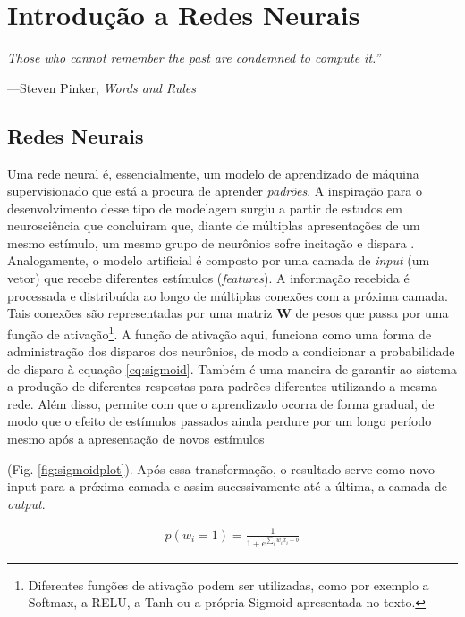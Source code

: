 \chapter{Introdução a Redes Neurais}
\label{ch:02-background}

\epigraph{\itshape Those who cannot remember the past are condemned to compute it.''}{---Steven Pinker, \textit{Words and Rules}}

\section{Redes Neurais}

Uma rede neural é, essencialmente, um modelo de aprendizado de máquina supervisionado %
que está a procura de aprender \textit{padrões}. A inspiração para o desenvolvimento desse tipo de modelagem surgiu a partir de estudos em neurosciência %
que concluiram que, diante de múltiplas apresentações de um mesmo estímulo, um mesmo grupo de neurônios sofre incitação e dispara%
.  Analogamente, o modelo artificial é composto por uma camada de \textit{input} (um vetor) que recebe diferentes estímulos (\textit{features}). A informação recebida é processada e distribuída ao longo de múltiplas conexões com a próxima camada. Tais conexões são representadas por uma matriz \textbf{W} de pesos que passa por uma função de ativação\footnote{Diferentes funções de ativação podem ser utilizadas, como por exemplo a Softmax, a RELU, a Tanh ou a própria Sigmoid apresentada no texto.}. A função de ativação aqui, funciona como uma forma de administração dos disparos dos neurônios, de modo a condicionar a probabilidade de disparo à equação \ref{eq:sigmoid}. Também é uma maneira de garantir ao sistema a produção de diferentes respostas para padrões diferentes utilizando a mesma rede. Além disso, permite com que o aprendizado ocorra de forma gradual, de modo que o efeito de estímulos passados ainda perdure por um longo período mesmo após a apresentação de novos estímulos 

(Fig. \ref{fig:sigmoidplot}). Após essa transformação, o resultado serve como novo input para a próxima camada e assim sucessivamente até a última, a camada de \textit{output}.

\begin{align}\label{eq:sigmoid}
p(w_{i} = 1) = \frac{1}{1+e^{\sum_{i} w_{i}x_{i} + b}}
\end{align}

